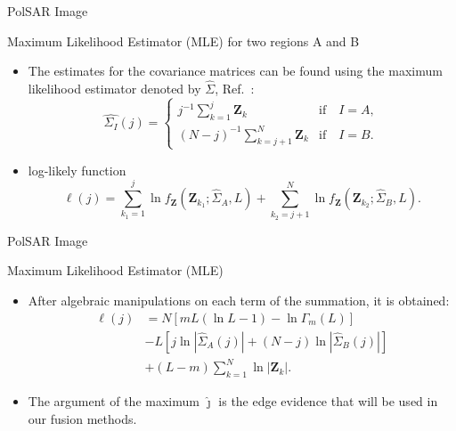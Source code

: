 \documentclass[10pt]{beamer}
\begin{document}
\begin{frame}[fragile]{PolSAR Image}
\begin{alertblock}{Maximum Likelihood Estimator (MLE) for two regions A and B}
\begin{itemize}
\item The estimates for the covariance matrices can be found using the maximum likelihood estimator denoted by $\widehat{\Sigma}$, Ref.~\cite{good}: 
\begin{equation}
\widehat{\Sigma_{I}}(j) = \left\{
\begin{array}{lc}
	j^{-1}\sum_{k=1}^{j}\mathbf{Z}_{k}  & \mbox{if}\quad I=A,  \\
        (N-j)^{-1}\sum_{k=j+1}^{N}\mathbf{Z}_{k} & \mbox{if}\quad I=B.
\end{array}
\right.\label{eq_08}
\end{equation}
    \item log-likely function
\begin{equation}
\ell(j) =
	\sum_{k_1=1}^{j}\ln f_{\mathbf{Z}}(\mathbf{Z}_{k_1}; \widehat\Sigma_{A},L) + \sum_{k_2=j+1}^{N}\ln f_{\mathbf{Z}}(\mathbf{Z}_{k_2}; \widehat\Sigma_{B},L).
	\label{eq_07}
\end{equation}
\end{itemize}
\end{alertblock}
\end{frame}


\begin{frame}[fragile]{PolSAR Image}
\begin{alertblock}{Maximum Likelihood Estimator (MLE)}
\begin{itemize}
	\item After algebraic manipulations on each term of the summation, it is obtained:
\begin{align}\nonumber
	\ell(j)&=N\left[mL(\ln{L}-1)-\ln{\Gamma_m(L)}\right]\\\nonumber
	&- L\left[j\ln{|\widehat{\Sigma}_{A}(j)|} +(N-j)\ln{|\widehat{\Sigma}_{B}(j)|}\right] \\
	&+ (L-m)\sum_{k=1}^{N}\ln{|\mathbf{Z}_{k}|}.\label{eq_09}
\end{align}

\item The argument of the maximum $\widehat{\jmath}$ is the edge evidence that will be used in our fusion methods.
\end{itemize}
\end{alertblock}
\end{frame}
\end{document}
